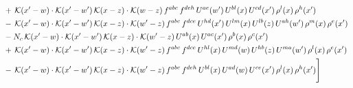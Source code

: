 \documentclass[9pt]{article}
\numberwithin{equation}{section}
\begin{document}
\begin{align}
& +\,\mathcal{K}(x'-w)\cdot\mathcal{K}(x'-w')\,\mathcal{K}(x-z)\cdot\mathcal{K}(w-z)\,f^{abc}\,f^{deh}\,U^{ae}(w')\,U^{bl}(x)\,U^{cd}(x')\,\rho^{l}(x)\,\rho^{h}(x')\notag\\
& -\,\mathcal{K}(x'-w)\cdot\mathcal{K}(x'-w')\,\mathcal{K}(x-z)\cdot\mathcal{K}(w'-z)\,f^{abc}\,f^{dce}\,U^{hd}(x')\,U^{lm}(x)\,U^{lb}(z)\,U^{ah}(w')\,\rho^{m}(x)\,\rho^{e}(x')\notag\\
& -N_{c}\,\mathcal{K}(x'-w)\cdot\mathcal{K}(x'-w')\,\mathcal{K}(x-z)\cdot\mathcal{K}(w'-z)\,U^{ab}(x)\,U^{ac}(x')\,\rho^{b}(x)\,\rho^{c}(x')\notag\\
& +\,\mathcal{K}(x'-w)\cdot\mathcal{K}(x'-w')\,\mathcal{K}(x-z)\cdot\mathcal{K}(w'-z)\,f^{abc}\,f^{dce}\,U^{hl}(x)\,U^{md}(w)\,U^{hb}(z)\,U^{ma}(w')\,\rho^{l}(x)\,\rho^{e}(x')\notag\\
& -\,\mathcal{K}(x'-w)\cdot\mathcal{K}(x'-w')\,\mathcal{K}(x-z)\cdot\mathcal{K}(w'-z)\,f^{abc}\,f^{deh}\,U^{bl}(x)\,U^{ad}(w)\,U^{ce}(x')\,\rho^{l}(x)\,\rho^{h}(x')\Bigg]
\end{align}
\end{document}
